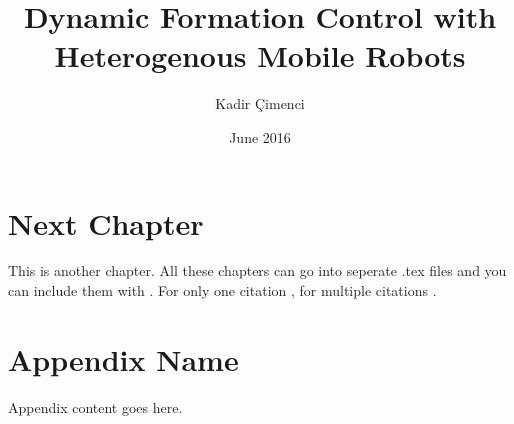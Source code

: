 \documentclass[chaparabic,ee,ms,12pt,oneandhalf]{metu}
\author{Kadir Çimenci}
\title{Dynamic Formation Control with Heterogenous Mobile Robots}
\date{June 2016}
\begin{document}
\begin{preliminaries}


\end{preliminaries}
%   
% 
%



  

\chapter{Next Chapter}
This is another chapter. All these chapters can go into seperate .tex files and you can include
them with \verb||. For only one citation \cite{bpeltools}, for multiple citations \cite{atkinson04,erl05,kitchenham07}.

	
%


\appendix
\chapter{Appendix Name}
Appendix content goes here.
 
%

\end{document}
